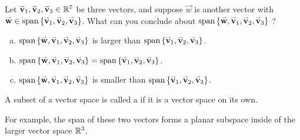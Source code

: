 \begin{activity}{5}
Let \(\vec{v}_1, \vec{v}_2, \vec{v}_3 \in \IR^7\) be three vectors, and suppose \(\vec{w}\) is another vector with \(\vec{w} \in \vspan \left\{ \vec{v}_1, \vec{v}_2, \vec{v}_3 \right\}\).  What can you conclude about \( \vspan \left\{ \vec{w}, \vec{v}_1, \vec{v}_2, \vec{v}_3 \right\} \) ?
\begin{enumerate}[(a)]
\item \( \vspan \left\{ \vec{w}, \vec{v}_1, \vec{v}_2, \vec{v}_3 \right\} \) is larger than \( \vspan \left\{ \vec{v}_1, \vec{v}_2, \vec{v}_3 \right\} \).
\item \( \vspan \left\{ \vec{w}, \vec{v}_1, \vec{v}_2, \vec{v}_3 \right\}  = \vspan \left\{ \vec{v}_1, \vec{v}_2, \vec{v}_3 \right\} \).
\item \( \vspan \left\{ \vec{w}, \vec{v}_1, \vec{v}_2, \vec{v}_3 \right\} \) is smaller than \( \vspan \left\{ \vec{v}_1, \vec{v}_2, \vec{v}_3 \right\} \).
\end{enumerate}
\end{activity}




\begin{definition}
  A subset of a vector space is called a  if it is
  a vector space on its own.

  \vspace{1em}

  For example, the span of these two vectors forms a planar subspace
  inside of the larger vector space \(\IR^3\).

  \begin{center}
  \end{center}
\end{definition}




